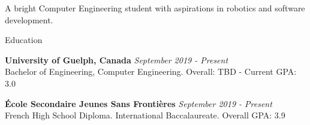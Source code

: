 \documentclass{resume}
\begin{document}
    \begin{rSection}{}

        \begin{center}
            A bright Computer Engineering student with aspirations in
            robotics and software development.
        \end{center}

    \end{rSection}

    \begin{rSection}{Education}

        \textbf{University of Guelph, Canada}
        \hfill{\em September 2019 - Present}
        \\ Bachelor of Engineering, Computer Engineering.
        \hfill{Overall: TBD - Current GPA: 3.0}

        \textbf{École Secondaire Jeunes Sans Frontières}
        \hfill {\em September 2019 - Present}
        \\ French High School Diploma.
        International Baccalaureate.
        \hfill { Overall GPA: 3.9}

    \end{rSection}
\end{document}
